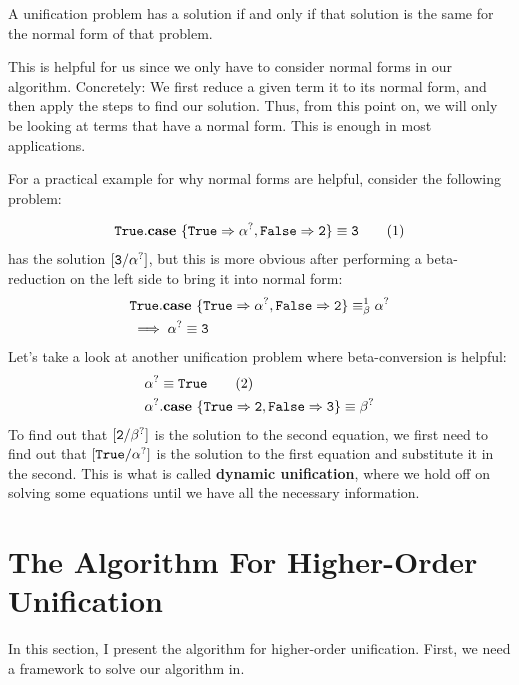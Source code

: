 \documentclass[twoside,12pt,a4paper]{article}
\begin{document}
\begin{theorem}
    A unification problem has a solution if and only if that solution is the same for the normal form of that problem. 
\end{theorem}

This is helpful for us since we only have to consider normal forms in our algorithm.
Concretely: We first reduce a given term it to its normal form, and then apply the steps to find our solution.
Thus, from this point on, we will only be looking at terms that have a normal form. This is enough in most applications. %

For a practical example for why normal forms are helpful, consider the following problem:
\begin{example}
    \begin{align*}
        \mathtt{True}.\textbf{case}\ \{\mathtt{True} \Rightarrow \alpha^?, \mathtt{False} \Rightarrow \mathtt{2}\} \equiv \mathtt{3} \tag{1}
    \end{align*}
    has the solution $[\mathtt{3/\alpha^?}]$, but this is more obvious after performing a beta-reduction on the left side 
    to bring it into normal form:
    \begin{align*}
        &\mathtt{True}.\textbf{case}\ \{\mathtt{True} \Rightarrow \alpha^?, \mathtt{False} \Rightarrow \mathtt{2}\} \equiv_{\beta}^1 \alpha^?\\
        &\implies \alpha^? \equiv \mathtt{3}   
    \end{align*}       
Let's take a look at another unification problem where beta-conversion is helpful:
\begin{align*}
    &\alpha^? \equiv \mathtt{True} \tag{2}\\
    &\alpha^?.\textbf{case}\ \{\mathtt{True\Rightarrow 2, False\Rightarrow 3}\} \equiv \beta^?
\end{align*}
To find out that $[\mathtt{2}/\beta^?]$ is the solution to the second equation, we first need to find out that
$[\mathtt{True}/\alpha^?]$ is the solution to the first equation and substitute it in the second.
This is what is called \textbf{dynamic unification}, where we hold off on solving some equations 
until we have all the necessary information. 
 
\end{example}

\section{The Algorithm For Higher-Order Unification}\label{The Algorithm For Higher-Order Unification}
In this section, I present the algorithm for higher-order unification.
First, we need a framework to solve our algorithm in.
\end{document}

